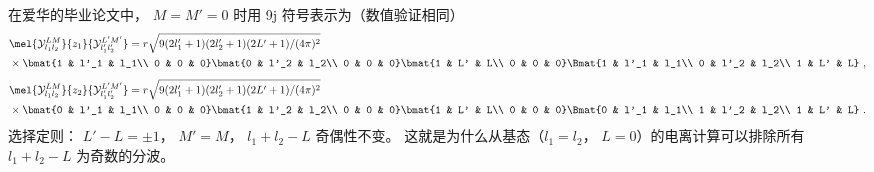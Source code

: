 在爱华的毕业论文中， $M = M' = 0$ 时用 9j 符号表示为（数值验证相同）
\begin{equation}
\begin{aligned}
&\mel{\mathcal{Y}_{l_1 l_2}^{LM}}{z_1}{\mathcal{Y}_{l_1' l_2'}^{L'M'}}=
r\sqrt{9(2l'_1+1)(2l'_2+1)(2L'+1)/(4\pi)^2}\\
&\times\bmat{1 & l'_1 & l_1\\ 0 & 0 & 0} \bmat{0 & l'_2 & l_2\\ 0 & 0 & 0} \bmat{1 & L' & L\\ 0 & 0 & 0}\Bmat{1 & l'_1 & l_1\\ 0 & l'_2 & l_2\\ 1 & L' & L}~,
\end{aligned}
\end{equation}
\begin{equation}
\begin{aligned}
&\mel{\mathcal{Y}_{l_1 l_2}^{LM}}{z_2}{\mathcal{Y}_{l_1' l_2'}^{L'M'}}=
r\sqrt{9(2l'_1+1)(2l'_2+1)(2L'+1)/(4\pi)^2}\\
&\times\bmat{0 & l'_1 & l_1\\ 0 & 0 & 0} \bmat{1 & l'_2 & l_2\\ 0 & 0 & 0} \bmat{1 & L' & L\\ 0 & 0 & 0}\Bmat{0 & l'_1 & l_1\\ 1 & l'_2 & l_2\\ 1 & L' & L}~.
\end{aligned}
\end{equation}
选择定则： $L' - L = \pm 1$， $M' = M$， $l_1+l_2-L$ 奇偶性不变。 %
这就是为什么从基态（$l_1=l_2$， $L=0$）的电离计算可以排除所有 $l_1+l_2-L$ 为奇数的分波。

